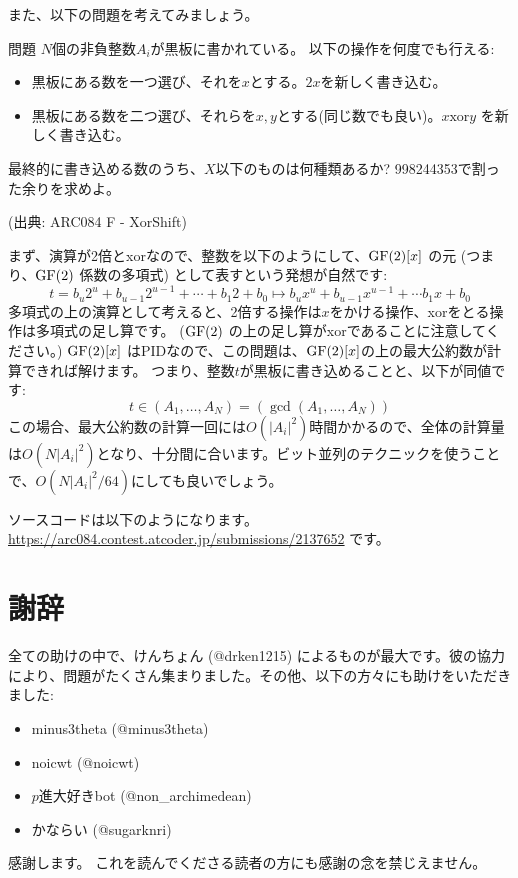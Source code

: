 \documentclass{jsarticle}
\begin{document}
 また、以下の問題を考えてみましょう。
 \begin{itembox}[l]{問題}
  $N$個の非負整数$A_i$が黒板に書かれている。
  以下の操作を何度でも行える:
  \begin{itemize}
   \item 黒板にある数を一つ選び、それを$x$とする。$2x$を新しく書き込む。
   \item 黒板にある数を二つ選び、それらを$x,y$とする(同じ数でも良い)。$x \mathbin{\mathrm{xor}} y$ を新しく書き込む。
  \end{itemize}
  最終的に書き込める数のうち、$X$以下のものは何種類あるか? 998244353で割った余りを求めよ。

  (出典: ARC084 F - XorShift)
 \end{itembox}
 まず、演算が2倍とxorなので、整数を以下のようにして、$\mathrm{GF}(2)[x]$ の元
 (つまり、$\mathrm{GF}(2)$ 係数の多項式) として表すという発想が自然です:
 \begin{displaymath}
  t = b_u 2^u + b_{u-1}2^{u-1} + \cdots + b_1 2 + b_0 \mapsto
  b_u x^u + b_{u-1} x^{u-1} + \cdots b_1 x + b_0
 \end{displaymath}
 多項式の上の演算として考えると、2倍する操作は$x$をかける操作、xorをとる操作は多項式の足し算です。 ($\mathrm{GF}(2)$ の上の足し算がxorであることに注意してください。)
 $\mathrm{GF}(2)[x]$ はPIDなので、この問題は、$\mathrm{GF}(2)[x]$の上の最大公約数が計算できれば解けます。
 つまり、整数$t$が黒板に書き込めることと、以下が同値です:
 \begin{displaymath}
  t \in (A_1, \ldots, A_N) = (\gcd(A_1, \ldots, A_N))
 \end{displaymath}
 この場合、最大公約数の計算一回には$O(|A_i|^2)$時間かかるので、全体の計算量は$O(N|A_i|^2)$となり、十分間に合います。ビット並列のテクニックを使うことで、$O(N|A_i|^2/64)$にしても良いでしょう。

 ソースコードは以下のようになります。\url{https://arc084.contest.atcoder.jp/submissions/2137652} です。
 
\printindex
 \section*{謝辞}
 \label{sec:acknowledgements}
 全ての助けの中で、けんちょん (@drken1215) によるものが最大です。彼の協力により、問題がたくさん集まりました。その他、以下の方々にも助けをいただきました:
 \begin{itemize}
  \item minus3theta (@minus3theta)
  \item noicwt (@noicwt)
  \item $p$進大好きbot (@non\_archimedean)
  \item かならい (@sugarknri)
 \end{itemize}
 感謝します。
 これを読んでくださる読者の方にも感謝の念を禁じえません。



\end{document}
